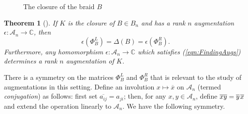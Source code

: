 \documentclass[11pt]{amsart}
\def\C{{\mathbb C}}
\def\A{{\mathcal A}}
\newtheorem{thm}{Theorem}[section]
\begin{document}
    \begin{figure}[ht]
    \caption{The closure of the braid $B$}
    \label{fig:BClosure}
    \end{figure}

  \begin{thm}[\cite{Cor13b}] If $K$ is the closure of $B\in B_n$ and has a rank $n$ augmentation $\epsilon:\A_n\to\C$, then 
    \begin{equation}
    \epsilon(\Phi_B^L)=\Delta(B)=\epsilon(\Phi_B^R).
    \label{eqn:FindingAugs}
    \end{equation}
    Furthermore, any homomorphism $\epsilon:\A_n\to\C$ which satisfies (\ref{eqn:FindingAugs}) determines a rank $n$ augmentation of $K$. 
  \label{thm:RanknAugs}
  \end{thm}

   There is a symmetry on the matrices $\Phi_B^L$ and $\Phi_B^R$ that is relevant to the study of augmentations in this setting. Define an involution $x\mapsto\overline x$ on $\A_n$ (termed \emph{conjugation}) as follows: first set $\overline{a_{ij}}=a_{ji}$; then, for any $x,y\in\A_n$, define $\overline{xy}=\overline y\hspace*{1pt}\overline x$ and extend the operation linearly to $\A_n$. We have the following symmetry.
\end{document}
